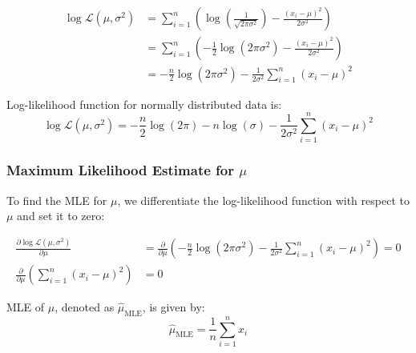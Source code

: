 \documentclass[handout]{beamer}
\begin{document}
\begin{frame}
   
    \begin{align*}
        \log \mathcal{L}(\mu, \sigma^2) &= \sum_{i=1}^n \left( \log \left( \frac{1}{\sqrt{2\pi\sigma^2}} \right) -\frac{(x_i-\mu)^2}{2\sigma^2} \right) \\
        &= \sum_{i=1}^n \left( -\frac{1}{2} \log (2\pi\sigma^2) -\frac{(x_i-\mu)^2}{2\sigma^2} \right) \\
        &= -\frac{n}{2} \log (2\pi\sigma^2) - \frac{1}{2\sigma^2} \sum_{i=1}^n (x_i-\mu)^2
        \end{align*}
        \begin{tcolorbox}[colback=metropolisblue!5,colframe=metropolisblue,title=Log Likelihood Function for Univariate Normal Distribution]
            Log-likelihood function for normally distributed data is:
            \[
                \log \mathcal{L}(\mu, \sigma^2) = -\frac{n}{2} \log(2\pi) - n\log(\sigma) - \frac{1}{2\sigma^2} \sum_{i=1}^n (x_i-\mu)^2
                \]
        \end{tcolorbox}
\end{frame}








\begin{frame}
    \frametitle{Maximum Likelihood Estimate for $\mu$}
    
    To find the MLE for $\mu$, we differentiate the log-likelihood function with respect to $\mu$ and set it to zero:
    
    \begin{align*}
        \frac{\partial \log \mathcal{L}(\mu, \sigma^2)}{\partial \mu} &= \frac{\partial}{\partial \mu} \left(-\frac{n}{2} \log (2\pi\sigma^2) - \frac{1}{2\sigma^2} \sum_{i=1}^n (x_i-\mu)^2\right) =0\\
        \frac{\partial}{\partial \mu} \left(\sum_{i=1}^n (x_i-\mu)^2\right) &= 0
    \end{align*}
    
    \begin{tcolorbox}[colback=metropolisblue!5,colframe=metropolisblue,title=Maximum Likelihood Estimate for $\mu$]
        MLE of $\mu$, denoted as $\hat{\mu}_{\text{MLE}}$, is given by:
        \begin{equation*}
            \hat{\mu}_{\text{MLE}} = \frac{1}{n}\sum_{i=1}^n x_i
        \end{equation*}
    \end{tcolorbox}
    
    \end{frame}
\end{document}
